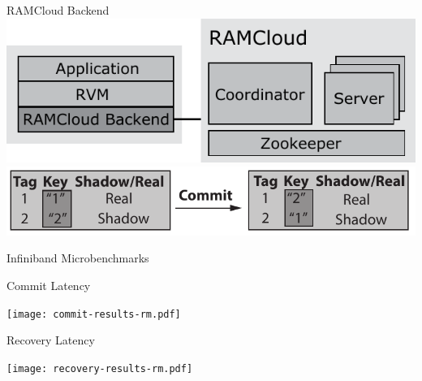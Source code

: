 \documentclass{beamer}
\begin{document}
\begin{frame}{RAMCloud Backend}
    \centering
    \includegraphics[scale=0.7]{ramcloud_backend_design_final.pdf}
    \vspace{2em}
    \includegraphics[scale=0.7]{ramcloud_backend_commit.pdf}
\end{frame}

\begin{frame}{Infiniband Microbenchmarks}
    \centering
    \begin{minipage}{0.45\textwidth}
        \centering
        Commit Latency

        \texttt{[image: commit-results-rm.pdf]}
    \end{minipage}
    \begin{minipage}{0.45\textwidth}
        \centering
        Recovery Latency

        \texttt{[image: recovery-results-rm.pdf]}
    \end{minipage}
\end{frame}
\end{document}
